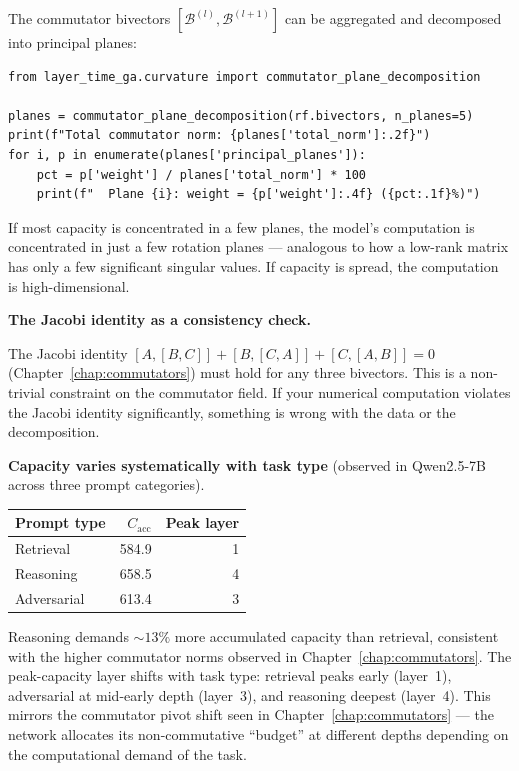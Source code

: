 \documentclass[11pt, twoside, openright]{memoir}
\newcommand{\bivec}[1]{\mathcal{B}^{(#1)}}  %
\numberwithin{equation}{chapter}
\begin{document}
The commutator bivectors $[\bivec{l}, \bivec{l+1}]$ can be aggregated
and decomposed into principal planes:

\begin{lstlisting}[caption={Capacity with plane decomposition}]
from layer_time_ga.curvature import commutator_plane_decomposition

planes = commutator_plane_decomposition(rf.bivectors, n_planes=5)
print(f"Total commutator norm: {planes['total_norm']:.2f}")
for i, p in enumerate(planes['principal_planes']):
    pct = p['weight'] / planes['total_norm'] * 100
    print(f"  Plane {i}: weight = {p['weight']:.4f} ({pct:.1f}%)")
\end{lstlisting}

If most capacity is concentrated in a few planes, the model's
computation is concentrated in just a few rotation planes --- analogous to how a low-rank matrix has only a few significant singular values.  If capacity is spread, the computation is
high-dimensional.

\begin{gabox}
\textbf{The Jacobi identity as a consistency check.}

The Jacobi identity $[A,[B,C]] + [B,[C,A]] + [C,[A,B]] = 0$
(Chapter~\ref{chap:commutators}) must hold for any three bivectors.
This is a non-trivial constraint on the commutator field.  If your
numerical computation violates the Jacobi identity significantly,
something is wrong with the data or the decomposition.
\end{gabox}

\begin{finding}
\textbf{Capacity varies systematically with task type}
(observed in Qwen2.5-7B across three prompt categories).

\medskip
\begin{center}
\renewcommand{\arraystretch}{1.3}\small
\begin{tabular}{@{} l r r @{}}
\toprule
\textbf{Prompt type} & $C_{\mathrm{acc}}$ & \textbf{Peak layer} \\
\midrule
Retrieval   & 584.9 & 1 \\
Reasoning   & 658.5 & 4 \\
Adversarial & 613.4 & 3 \\
\bottomrule
\end{tabular}
\end{center}

\medskip
Reasoning demands ${\sim}13\%$ more accumulated capacity than retrieval,
consistent with the higher commutator norms observed in
Chapter~\ref{chap:commutators}.  The peak-capacity layer shifts with
task type: retrieval peaks early (layer~1), adversarial at mid-early
depth (layer~3), and reasoning deepest (layer~4).  This mirrors the
commutator pivot shift seen in Chapter~\ref{chap:commutators} ---
the network allocates its non-commutative ``budget'' at different
depths depending on the computational demand of the task.
\end{finding}
\end{document}

